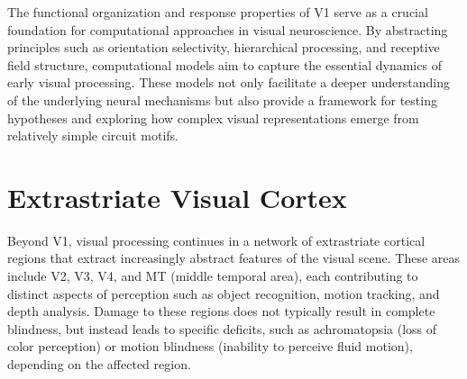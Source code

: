 The functional organization and response properties of V1 serve as a crucial foundation for computational approaches in visual neuroscience. By abstracting principles such as orientation selectivity, hierarchical processing, and receptive field structure, computational models aim to capture the essential dynamics of early visual processing. These models not only facilitate a deeper understanding of the underlying neural mechanisms but also provide a framework for testing hypotheses and exploring how complex visual representations emerge from relatively simple circuit motifs.

\section{Extrastriate Visual Cortex}
\label{sec:extrastriate}

Beyond V1, visual processing continues in a network of extrastriate cortical regions that extract increasingly abstract features of the visual scene. These areas include V2, V3, V4, and MT (middle temporal area), each contributing to distinct aspects of perception such as object recognition, motion tracking, and depth analysis. Damage to these regions does not typically result in complete blindness, but instead leads to specific deficits, such as achromatopsia (loss of color perception) or motion blindness (inability to perceive fluid motion), depending on the affected region.
